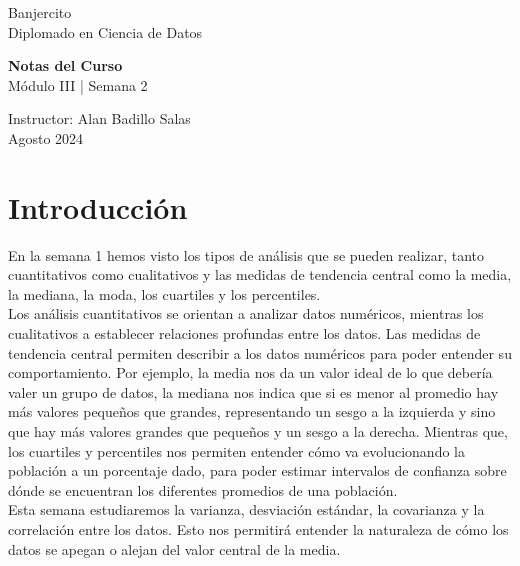 \documentclass{article}
\begin{document}
\begin{center}
    \Large Banjercito \\[24pt]
    \Large Diplomado en Ciencia de Datos
\end{center}

\vfill

\begin{flushleft}
    \LARGE \textbf{Notas del Curso} \\[12pt]
    \LARGE Módulo III | Semana 2 \\[24pt]
\end{flushleft}

\vfil

\begin{flushleft}
    Instructor: Alan Badillo Salas \\[12pt]
    Agosto 2024 \\[24pt]
\end{flushleft}

\vfill

\section{Introducción}

En la semana 1 hemos visto los tipos de análisis que se pueden realizar, tanto cuantitativos como cualitativos y las medidas de tendencia central como la media, la mediana, la moda, los cuartiles y los percentiles.
\\[12pt]
Los análisis cuantitativos se orientan a analizar datos numéricos, mientras los cualitativos a establecer relaciones profundas entre los datos. Las medidas de tendencia central permiten describir a los datos numéricos para poder entender su comportamiento. Por ejemplo, la media nos da un valor ideal de lo que debería valer un grupo de datos, la mediana nos indica que si es menor al promedio hay más valores pequeños que grandes, representando un sesgo a la izquierda y sino que hay más valores grandes que pequeños y un sesgo a la derecha. Mientras que, los cuartiles y percentiles nos permiten entender cómo va evolucionando la población a un porcentaje dado, para poder estimar intervalos de confianza sobre dónde se encuentran los diferentes promedios de una población.
\\[12pt]
Esta semana estudiaremos la varianza, desviación estándar, la covarianza y la correlación entre los datos. Esto nos permitirá entender la naturaleza de cómo los datos se apegan o alejan del valor central de la media.
\end{document}
